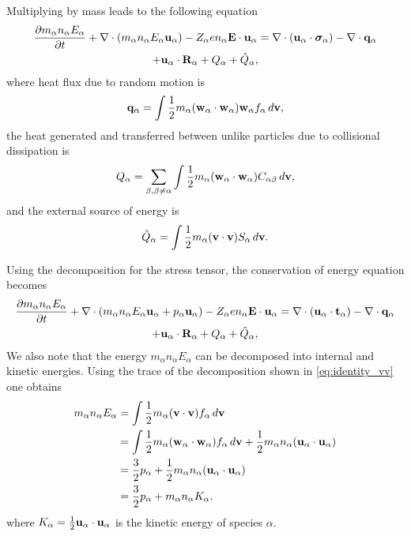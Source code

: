 \documentclass[a4paper,11pt]{report}
\begin{document}
Multiplying by mass leads to the following equation
\begin{multline}
\label{eq:energy_derv_5}
\frac{\partial m_\alpha n_\alpha E_\alpha}{\partial t} + \nabla \cdot (m_\alpha n_\alpha E_\alpha \mathbf{u}_\alpha ) - Z_\alpha e n_\alpha \mathbf{E} \cdot \mathbf{u}_\alpha = \nabla \cdot ( \mathbf{u}_\alpha \cdot \boldsymbol{\sigma}_\alpha ) - \nabla \cdot \mathbf{q}_\alpha \\
+ \mathbf{u}_\alpha \cdot \mathbf{R}_\alpha + Q_{\alpha} + \hat{Q}_\alpha, 
\end{multline}
where heat flux due to random motion is
\begin{equation}
\mathbf{q}_\alpha = \int \frac{1}{2} m_\alpha (\mathbf{w}_\alpha \cdot \mathbf{w}_\alpha ) \mathbf{w}_\alpha f_\alpha \, d\mathbf{v},
\end{equation}
the heat generated and transferred between unlike particles due to collisional dissipation is 
\begin{equation}
Q_{\alpha} = \sum_{\beta,\beta \ne \alpha} \int \frac{1}{2} m_\alpha (\mathbf{w}_\alpha \cdot \mathbf{w}_\alpha) C_{\alpha \beta} \, d\mathbf{v},
\end{equation}
and the external source of energy is
\begin{equation}
\hat{Q}_\alpha = \int \frac{1}{2} m_\alpha (\mathbf{v} \cdot \mathbf{v}) S_\alpha \, d\mathbf{v}.
\end{equation}

Using the decomposition for the stress tensor, the conservation of energy equation becomes
\begin{multline}
\label{eq:energy_derv_6}
\frac{\partial m_\alpha n_\alpha E_\alpha}{\partial t} + \nabla \cdot (m_\alpha n_\alpha E_\alpha \mathbf{u}_\alpha + p_\alpha \mathbf{u}_\alpha ) - Z_\alpha e n_\alpha \mathbf{E} \cdot \mathbf{u}_\alpha = \nabla \cdot ( \mathbf{u}_\alpha \cdot \mathbf{t}_\alpha ) - \nabla \cdot \mathbf{q}_\alpha \\
+ \mathbf{u}_\alpha \cdot \mathbf{R}_\alpha + Q_{\alpha} + \hat{Q}_\alpha, 
\end{multline}
We also note that the energy $m_\alpha n_\alpha E_\alpha$ can be decomposed into internal and kinetic energies. Using the trace of the decomposition shown in \cref{eq:identity_vv} one obtains
\begin{align}
m_\alpha n_\alpha E_\alpha & = \int \frac{1}{2} m_\alpha (\mathbf{v} \cdot \mathbf{v}) f_\alpha \, d\mathbf{v} \nonumber \\
& = \int \frac{1}{2} m_\alpha (\mathbf{w}_\alpha \cdot \mathbf{w}_\alpha) f_\alpha \, d\mathbf{v} + \frac{1}{2} m_\alpha n_\alpha (\mathbf{u}_\alpha \cdot \mathbf{u}_\alpha) \nonumber \\
& = \frac{3}{2} p_\alpha + \frac{1}{2} m_\alpha n_\alpha (\mathbf{u}_\alpha \cdot \mathbf{u}_\alpha) \nonumber \\
& = \frac{3}{2} p_\alpha + m_\alpha n_\alpha K_\alpha.
\end{align}
where $K_\alpha = \frac{1}{2} \mathbf{u}_\alpha \cdot \mathbf{u}_\alpha$ is the kinetic energy of species $\alpha$.
\end{document}
